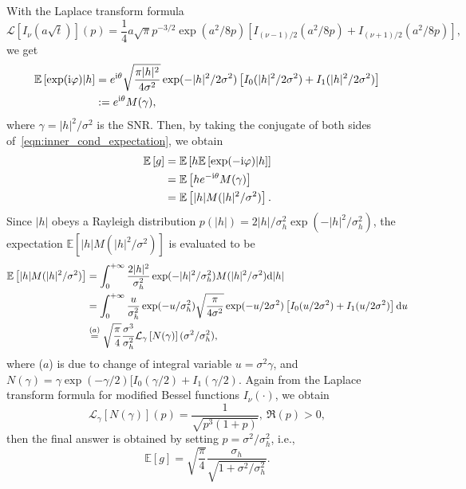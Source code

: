 \documentclass[a4paper,12pt]{article}
\def \ri {{\rm i}}
\begin{document}
With the Laplace transform formula 
\begin{equation}
    \mathcal{L}\left[I_\nu(a\sqrt{t})\right](p) = \frac{1}{4}a\sqrt{\pi}p^{-3/2}\exp(a^2/8p)\left[ I_{(\nu-1)/2}(a^2/8p)+I_{(\nu+1)/2}(a^2/8p) \right],
\end{equation}
we get 
\begin{equation}
    \begin{aligned}
        \mathbb{E}\left[ \exp(\ri\varphi)|h \right] &= e^{\ri \theta}\sqrt{\frac{\pi|h|^2}{4\sigma^2}}\exp(-|h|^2/2\sigma^2)\left[I_0(|h|^2/2\sigma^2) + I_1(|h|^2/2\sigma^2)\right] \\
        &:= e^{\ri \theta}M(\gamma),
    \end{aligned}
    \label{eqn:inner_cond_expectation}
\end{equation}
where $\gamma = |h|^2/\sigma^2$ is the SNR. Then, by taking the conjugate of both sides of~\eqref{eqn:inner_cond_expectation}, we obtain 
\begin{equation}
    \begin{aligned}
        \mathbb{E}\left[g\right] &= \mathbb{E}\left[h\mathbb{E}\left[\exp(-\ri \varphi)|h\right]\right] \\
        &= \mathbb{E}\left[ he^{-\ri \theta}M(\gamma) \right] \\
        &= \mathbb{E}\left[ |h|M(|h|^2/\sigma^2) \right].
    \end{aligned}
\end{equation}
Since $|h|$ obeys a Rayleigh distribution $p(|h|) = 2|h|/\sigma_h^2\exp(-|h|^2/\sigma_h^2)$, the expectation $\mathbb{E}\left[ |h|M(|h|^2/\sigma^2) \right]$ is evaluated to be 
\begin{equation}
    \begin{aligned}
        \mathbb{E}\left[ |h|M(|h|^2/\sigma^2) \right] &= \int_0^{+\infty} \frac{2|h|^2}{\sigma_h^2}\exp(-|h|^2/\sigma_h^2) M(|h|^2/\sigma^2) {\rm d}|h| \\
        &= \int_0^{+\infty} \frac{u}{\sigma_h^2}\exp(-u/\sigma_h^2) \sqrt{\frac{\pi }{4\sigma^2}}\exp(-u/2\sigma^2)\left[I_0(u/2\sigma^2) + I_1(u/2\sigma^2)\right] {\rm d}u \\
        &\overset{(a)}{=} \sqrt{\frac{\pi}{4}}\frac{\sigma^3}{\sigma_h^2} \mathcal{L}_{\gamma}\left[N(\gamma)\right](\sigma^2/\sigma_h^2),
    \end{aligned}
\end{equation}
where ($a$) is due to change of integral variable $u=\sigma^2\gamma$, and $N(\gamma) = \gamma\exp(-\gamma/2)[I_0(\gamma/2)+I_1(\gamma/2)$. 
Again from the Laplace transform formula for modified Bessel functions $I_\nu(\cdot)$, we obtain 
\begin{equation}
    \mathcal{L}_{\gamma}\left[N(\gamma)\right](p) = \frac{1}{\sqrt{p^3(1+p)}},~{\Re(p)>0},
\end{equation}
then the final answer is obtained by setting $p=\sigma^2/\sigma_h^2$, i.e., 
\begin{equation}
    \mathbb{E}[g] = \sqrt{\frac{\pi}{4}}\frac{\sigma_h}{\sqrt{1+\sigma^2/\sigma_h^2}}.
\end{equation}
\end{document}
